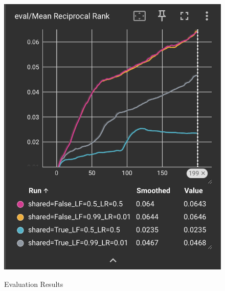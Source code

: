 \begin{figure}[H]
{        \includegraphics[width=\linewidth]{./figures/eval_Mean_Reciprocal_Rank}%
    }
    \caption{Evaluation Results}
\end{figure}


